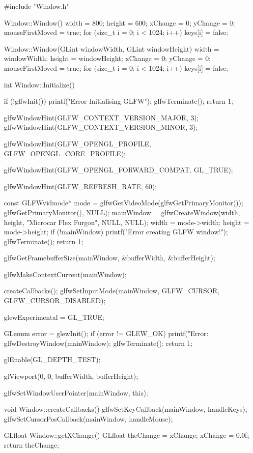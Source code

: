 \documentclass[a4paper,12pt]{article}
\numberwithin{equation}{section}
\begin{document}
\begin{cppcode}
#include "Window.h"

Window::Window()
{
	width = 800;
	height = 600;
	xChange = 0;
	yChange = 0;
	mouseFirstMoved = true;
	for (size_t i = 0; i < 1024; i++)
	{
		keys[i] = false;
	}
}

Window::Window(GLint windowWidth, GLint windowHeight)
{
	width = windowWidth;
	height = windowHeight;
	xChange = 0;
	yChange = 0;
	mouseFirstMoved = true;
	for (size_t i = 0; i < 1024; i++)
	{
		keys[i] = false;
	}
}

int Window::Initialize()
{
	if (!glfwInit())
	{
		printf("Error Initialising GLFW");
		glfwTerminate();
		return 1;
	}

	glfwWindowHint(GLFW_CONTEXT_VERSION_MAJOR, 3);
	glfwWindowHint(GLFW_CONTEXT_VERSION_MINOR, 3);

	glfwWindowHint(GLFW_OPENGL_PROFILE, GLFW_OPENGL_CORE_PROFILE);

	glfwWindowHint(GLFW_OPENGL_FORWARD_COMPAT, GL_TRUE);

	glfwWindowHint(GLFW_REFRESH_RATE, 60);

	const GLFWvidmode* mode = glfwGetVideoMode(glfwGetPrimaryMonitor());
    glfwGetPrimaryMonitor(), NULL);
	mainWindow = glfwCreateWindow(width, height, "Microcar Flex Furgon", NULL, NULL);
	width = mode->width;
	height = mode->height;
	if (!mainWindow)
	{
		printf("Error creating GLFW window!");
		glfwTerminate();
		return 1;
	}

	glfwGetFramebufferSize(mainWindow, &bufferWidth, &bufferHeight);

	glfwMakeContextCurrent(mainWindow);

	createCallbacks();
	glfwSetInputMode(mainWindow, GLFW_CURSOR, GLFW_CURSOR_DISABLED);

	glewExperimental = GL_TRUE;

	GLenum error = glewInit();
	if (error != GLEW_OK)
	{
		printf("Error: %
		glfwDestroyWindow(mainWindow);
		glfwTerminate();
		return 1;
	}

	glEnable(GL_DEPTH_TEST);

	glViewport(0, 0, bufferWidth, bufferHeight);

	glfwSetWindowUserPointer(mainWindow, this);
}

void Window::createCallbacks()
{
	glfwSetKeyCallback(mainWindow, handleKeys);
	glfwSetCursorPosCallback(mainWindow, handleMouse);
}

GLfloat Window::getXChange()
{
	GLfloat theChange = xChange;
	xChange = 0.0f;
	return theChange;
}


\end{cppcode}
\end{document}
